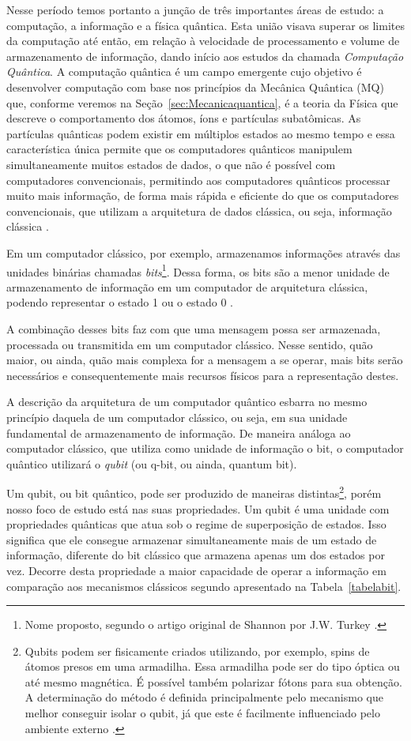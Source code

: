 Nesse período temos portanto a junção de três importantes áreas de estudo: a computação, a informação e a física quântica. Esta união visava superar os limites da computação até então, em relação à velocidade de processamento e volume de armazenamento de informação, dando início aos estudos da chamada \textit{Computação Quântica}. A computação quântica é um campo emergente cujo objetivo é desenvolver computação com base nos princípios da Mecânica Quântica (MQ) que, conforme veremos na Seção~\ref{sec:Mecanicaquantica}, é a teoria da Física que descreve o comportamento dos átomos, íons e partículas subatômicas. As partículas quânticas podem existir em múltiplos estados ao mesmo tempo e essa característica única permite que os computadores quânticos manipulem simultaneamente muitos estados de dados, o que não é possível com computadores convencionais, permitindo aos computadores quânticos processar muito mais informação, de forma mais rápida e eficiente do que os computadores convencionais, que utilizam a arquitetura de dados clássica, ou seja, informação clássica \cite{CompInfoQuantica}.

Em um computador clássico, por exemplo, armazenamos informações através das unidades binárias chamadas \textit{bits}\footnote{Nome proposto, segundo o artigo original de Shannon por J.W. Turkey \cite{MTC}.}. Dessa forma, os bits são a menor unidade de armazenamento de informação em um computador de arquitetura clássica, podendo representar o estado 1 ou o estado 0 \cite{MTC}.

A combinação desses bits faz com que uma mensagem possa ser armazenada, processada ou transmitida em um computador clássico. Nesse sentido, quão maior, ou ainda, quão mais complexa for a mensagem a se operar, mais bits serão necessários e consequentemente mais recursos físicos para a representação destes.

A descrição da arquitetura de um computador quântico esbarra no mesmo princípio daquela de um computador clássico, ou seja, em sua unidade fundamental de armazenamento de informação. De maneira análoga ao computador clássico, que utiliza como unidade de informação o bit, o computador quântico utilizará o \textit{qubit} (ou q-bit, ou ainda, quantum bit).

Um qubit, ou bit quântico, pode ser produzido de maneiras distintas\footnote{Qubits podem ser fisicamente criados utilizando, por exemplo, spins de átomos presos em uma armadilha. Essa armadilha pode ser do tipo óptica ou até mesmo magnética. É possível também polarizar fótons para sua obtenção. A determinação do método é definida principalmente pelo mecanismo que melhor conseguir isolar o qubit, já que este é facilmente influenciado pelo ambiente externo \cite{materialdidaticomecquantica}.}, porém nosso foco de estudo está nas suas propriedades. Um qubit é uma unidade com propriedades quânticas que atua sob o regime de superposição de estados. Isso significa que ele consegue armazenar simultaneamente mais de um estado de informação, diferente do bit clássico que armazena apenas um dos estados por vez. Decorre desta propriedade a maior capacidade de operar a informação em comparação aos mecanismos clássicos segundo apresentado na Tabela~\ref{tabelabit}.

